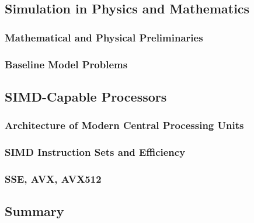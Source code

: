 \documentclass{stdlocal}
\begin{document}
  \subsection{Simulation in Physics and Mathematics} %
  \label{sub:simulation_in_physics_and_mathematics}
    \subsubsection{Mathematical and Physical Preliminaries} %
    \label{ssub:mathematical_and_physical_preliminaries}


    \subsubsection{Baseline Model Problems} %
    \label{ssub:baseline_model_problems}


  \subsection{SIMD-Capable Processors} %
  \label{sub:simd-capable_processors}
    \subsubsection{Architecture of Modern Central Processing Units} %
    \label{ssub:architecture_of_modern_central_processing_units}


    \subsubsection{SIMD Instruction Sets and Efficiency} %
    \label{ssub:simd_instruction_sets_and_efficiency}


    \subsubsection{SSE, AVX, AVX512} %
    \label{ssub:sse_avx_avx512}


  \subsection{Summary} %
  \label{sub:summary}

    \textcite{volchan2002,kneusel2018}
    \autocites[1]{volchan2002}[2]{kneusel2018}

\end{document}
